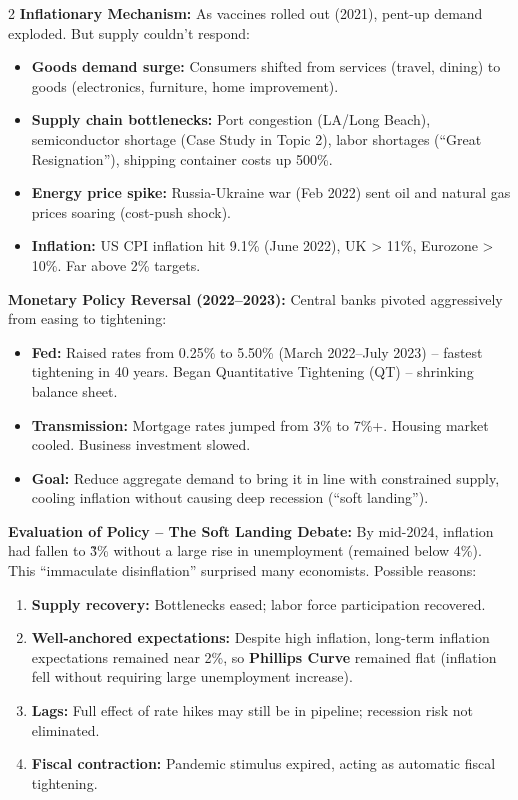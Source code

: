 \documentclass[10pt,a4paper]{article}
\begin{document}
\begin{multicols}{2}
\textbf{Inflationary Mechanism:}
As vaccines rolled out (2021), pent-up demand exploded. But supply couldn't respond:
\begin{itemize}[leftmargin=*,nosep]
    \item \textbf{Goods demand surge:} Consumers shifted from services (travel, dining) to goods (electronics, furniture, home improvement).
    \item \textbf{Supply chain bottlenecks:} Port congestion (LA/Long Beach), semiconductor shortage (Case Study in Topic 2), labor shortages (``Great Resignation''), shipping container costs up 500\%.
    \item \textbf{Energy price spike:} Russia-Ukraine war (Feb 2022) sent oil and natural gas prices soaring (cost-push shock).
    \item \textbf{Inflation:} US CPI inflation hit 9.1\% (June 2022), UK > 11\%, Eurozone > 10\%. Far above 2\% targets.
\end{itemize}

\textbf{Monetary Policy Reversal (2022--2023):}
Central banks pivoted aggressively from easing to tightening:
\begin{itemize}[leftmargin=*,nosep]
    \item \textbf{Fed:} Raised rates from 0.25\% to 5.50\% (March 2022--July 2023) -- fastest tightening in 40 years. Began Quantitative Tightening (QT) -- shrinking balance sheet.
    \item \textbf{Transmission:} Mortgage rates jumped from 3\% to 7\%+. Housing market cooled. Business investment slowed.
    \item \textbf{Goal:} Reduce aggregate demand to bring it in line with constrained supply, cooling inflation without causing deep recession (``soft landing'').
\end{itemize}

\textbf{Evaluation of Policy -- The Soft Landing Debate:}
By mid-2024, inflation had fallen to \~ 3\% without a large rise in unemployment (remained below 4\%). This ``immaculate disinflation'' surprised many economists. Possible reasons:
\begin{enumerate}[leftmargin=*,nosep]
    \item \textbf{Supply recovery:} Bottlenecks eased; labor force participation recovered.
    \item \textbf{Well-anchored expectations:} Despite high inflation, long-term inflation expectations remained near 2\%, so \textbf{Phillips Curve} remained flat (inflation fell without requiring large unemployment increase).
    \item \textbf{Lags:} Full effect of rate hikes may still be in pipeline; recession risk not eliminated.
    \item \textbf{Fiscal contraction:} Pandemic stimulus expired, acting as automatic fiscal tightening.
\end{enumerate}


\end{multicols}
\end{document}
